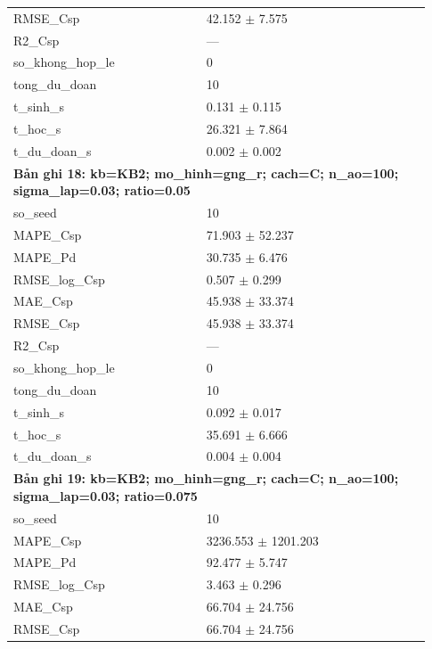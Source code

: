 \begin{longtable}{p{0.43\linewidth}p{0.50\linewidth}}
RMSE\_\allowbreak Csp & 42.152 $\pm$ 7.575 \\
R2\_\allowbreak Csp & — \\
so\_\allowbreak khong\_\allowbreak hop\_\allowbreak le & 0 \\
tong\_\allowbreak du\_\allowbreak doan & 10 \\
t\_\allowbreak sinh\_\allowbreak s & 0.131 $\pm$ 0.115 \\
t\_\allowbreak hoc\_\allowbreak s & 26.321 $\pm$ 7.864 \\
t\_\allowbreak du\_\allowbreak doan\_\allowbreak s & 0.002 $\pm$ 0.002 \\
\midrule
\multicolumn{2}{p{0.95\linewidth}}{\textbf{Bản ghi 18: kb=KB2; mo\_hinh=gng\_r; cach=C; n\_ao=100; sigma\_lap=0.03; ratio=0.05}} \\
so\_\allowbreak seed & 10 \\
MAPE\_\allowbreak Csp & 71.903 $\pm$ 52.237 \\
MAPE\_\allowbreak Pd & 30.735 $\pm$ 6.476 \\
RMSE\_\allowbreak log\_\allowbreak Csp & 0.507 $\pm$ 0.299 \\
MAE\_\allowbreak Csp & 45.938 $\pm$ 33.374 \\
RMSE\_\allowbreak Csp & 45.938 $\pm$ 33.374 \\
R2\_\allowbreak Csp & — \\
so\_\allowbreak khong\_\allowbreak hop\_\allowbreak le & 0 \\
tong\_\allowbreak du\_\allowbreak doan & 10 \\
t\_\allowbreak sinh\_\allowbreak s & 0.092 $\pm$ 0.017 \\
t\_\allowbreak hoc\_\allowbreak s & 35.691 $\pm$ 6.666 \\
t\_\allowbreak du\_\allowbreak doan\_\allowbreak s & 0.004 $\pm$ 0.004 \\
\midrule
\multicolumn{2}{p{0.95\linewidth}}{\textbf{Bản ghi 19: kb=KB2; mo\_hinh=gng\_r; cach=C; n\_ao=100; sigma\_lap=0.03; ratio=0.075}} \\
so\_\allowbreak seed & 10 \\
MAPE\_\allowbreak Csp & 3236.553 $\pm$ 1201.203 \\
MAPE\_\allowbreak Pd & 92.477 $\pm$ 5.747 \\
RMSE\_\allowbreak log\_\allowbreak Csp & 3.463 $\pm$ 0.296 \\
MAE\_\allowbreak Csp & 66.704 $\pm$ 24.756 \\
RMSE\_\allowbreak Csp & 66.704 $\pm$ 24.756 \\

\end{longtable}
